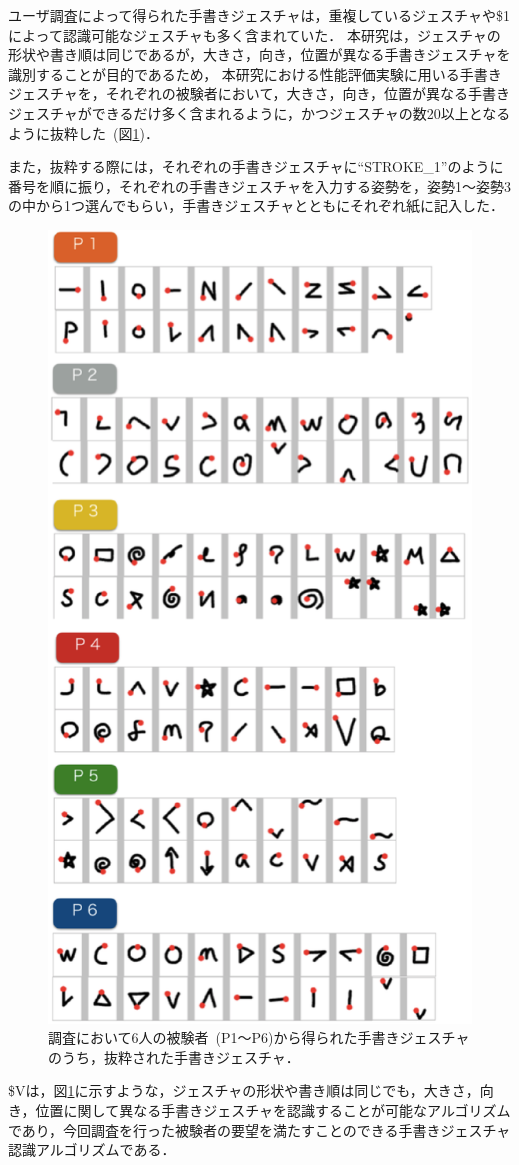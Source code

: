 ユーザ調査によって得られた手書きジェスチャは，重複しているジェスチャや\$1によって認識可能なジェスチャも多く含まれていた．
本研究は，ジェスチャの形状や書き順は同じであるが，大きさ，向き，位置が異なる手書きジェスチャを識別することが目的であるため，
本研究における性能評価実験に用いる手書きジェスチャを，それぞれの被験者において，大きさ，向き，位置が異なる手書きジェスチャができるだけ多く含まれるように，かつジェスチャの数20以上となるように抜粋した~(図\ref{fig:elicetated_strokes})．

また，抜粋する際には，それぞれの手書きジェスチャに``STROKE\_1''のように番号を順に振り，それぞれの手書きジェスチャを入力する姿勢を，姿勢1〜姿勢3の中から1つ選んでもらい，手書きジェスチャとともにそれぞれ紙に記入した．

\begin{figure} [t]
 \begin{center}
  \includegraphics [width=0.7\columnwidth]{img/elicetated_strokes.eps}
  \caption{調査において6人の被験者~(P1〜P6)から得られた手書きジェスチャのうち，抜粋された手書きジェスチャ．}
  \label{fig:elicetated_strokes}
 \end{center}
\end{figure}

\$Vは，図\ref{fig:elicetated_strokes}に示すような，ジェスチャの形状や書き順は同じでも，大きさ，向き，位置に関して異なる手書きジェスチャを認識することが可能なアルゴリズムであり，今回調査を行った被験者の要望を満たすことのできる手書きジェスチャ認識アルゴリズムである．






